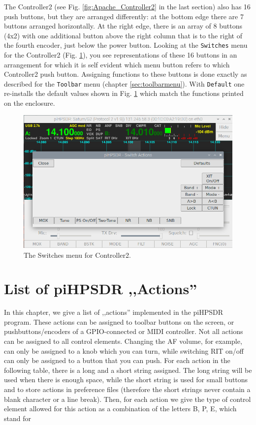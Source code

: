 \documentclass[12pt]{book}
\def\rett#1{\texttt{\color{red}#1}}
\def\bltt#1{\texttt{\color{blue}#1}}
\begin{document}
The Controller2 (see Fig. \ref{fig:Apache_Controller2} in the last section)
also has 16 push buttons, but they are arranged differently:
at the bottom edge there are 7 buttons arranged horizontally. At the right
edge, there is an array of 8 buttons (4x2) with one additional button
above the right column that is to the right of the fourth encoder, just
below the power button. Looking at the \bltt{Switches} menu for the
Controller2 (Fig. \ref{fig:SwitchMenuV2}), you see representations of
these 16 buttons in an arrangement for which it is self evident which
menu button refers to which Controller2 push button.
Assigning functions
to these buttons is done exactly as described for the \bltt{Toolbar} menu
(chapter \ref{sec:toolbarmenu}).
With \rett{Default} one re-installs the default values
shown in Fig. \ref{fig:SwitchMenuV2} which match the functions printed on the enclosure.

\begin{figure}[ht]
\center
\includegraphics[width=12cm]{SwitchMenuV2.png}
\caption{The Switches menu for Controller2.}
\label{fig:SwitchMenuV2}
\end{figure}


\appendix
\chapter{List of piHPSDR ,,Actions''}
\label{sec:actionlist}

In this chapter, we give a list of ,,actions'' implemented in the piHPSDR program. These actions can be
assigned to toolbar buttons on the screen, or pushbuttons/encoders of a GPIO-connected or MIDI controller.
Not all actions can be assigned to all control elements. Changing the AF volume, for example, can only be
assigned to a knob
which you can turn, while switching RIT on/off can only be assigned to a button that you can push. For each
action in the following table, there is a long and a short string assigned. The long string will be used
when there is enough space, while the short string is used for small buttons and to store actions in
preference files (therefore the short strings never contain a blank character or a line break). Then, for
each action we give the type of control element allowed for this action as a combination of the letters B,
P, E, which stand for
\end{document}
